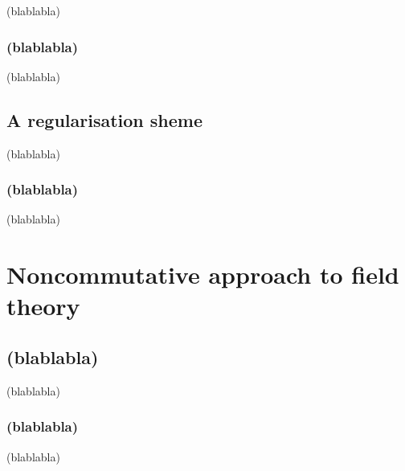 \documentclass[10pt]{book}
\theoremstyle{break}
\begin{document}
(blablabla)

\section{(blablabla)}

(blablabla)

\chapter{A regularisation sheme}

(blablabla)

\section{(blablabla)}

(blablabla)

\part{Noncommutative approach to field theory}

\chapter{(blablabla)}

(blablabla)

\section{(blablabla)}

(blablabla)
\end{document}
